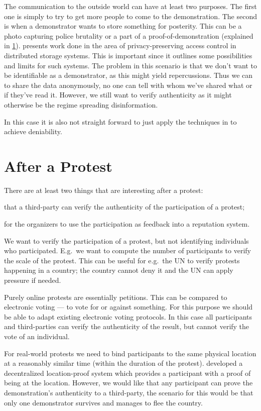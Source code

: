 \documentclass[a4paper]{llncs}
\begin{document}
The communication to the outside world can have at least two purposes.
The first one is simply to try to get more people to come to the demonstration.
The second is when a demonstrator wants to store something for posterity.
This can be a photo capturing police brutality or a part of 
a proof-of-demonstration (explained in \cref{AfterProtest}).
\citet{DistStorAccessControl} presents work done in the area of 
privacy-preserving access control in distributed storage systems.
This is important since it outlines some possibilities and limits for such 
systems.
The problem in this scenario is that we don't want to be identifiable as 
a demonstrator, as this might yield repercussions.
Thus we can to share the data anonymously, no one can tell with whom we've 
shared what or if they've read it.
However, we still want to verify authenticity as it might otherwise be the 
regime spreading disinformation.

In this case it is also not straight forward to just apply the techniques in 
\cite{OTPKX} to achieve deniability.

\section{After a Protest}
\label{AfterProtest}

There are at least two things that are interesting after a protest:
\begin{inparaenum}[(a)]
\item that a third-party can verify the authenticity of the participation of 
  a protest;
\item for the organizers to use the participation as feedback into a reputation 
  system.
\end{inparaenum}
We want to verify the participation of a protest, but not identifying 
individuals who participated.
E.g.\ we want to compute the number of participants to verify the scale of the 
protest.
This can be useful for e.g.\ the UN to verify protests happening in a country; 
the country cannot deny it and the UN can apply pressure if needed.

Purely online protests are essentially petitions.
This can be compared to electronic voting --- to vote for or against something.
For this purpose we should be able to adapt existing electronic voting 
protocols.
In this case all participants and third-parties can verify the authenticity of 
the result, but cannot verify the vote of an individual.

For real-world protests we need to bind participants to the same physical 
location at a reasonably similar time (within the duration of the protest).
\citet{PROPS} developed a decentralized location-proof system which provides 
a participant with a proof of being at the location.
However, we would like that any participant can prove the demonstration's 
authenticity to a third-party, the scenario for this would be that only one 
demonstrator survives and manages to flee the country.
\end{document}
